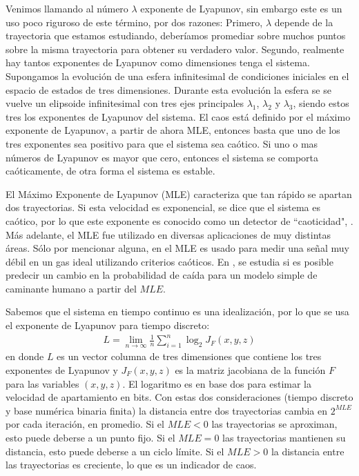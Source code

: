 Venimos llamando al número $\lambda$ exponente de Lyapunov, sin embargo este es un uso poco riguroso de este término, por dos razones:
Primero, $\lambda$ depende de la trayectoria que estamos estudiando, deberíamos promediar sobre muchos puntos sobre la misma trayectoria para obtener su verdadero valor.
Segundo, realmente hay tantos exponentes de Lyapunov como dimensiones tenga el sistema.
Supongamos la evolución de una esfera infinitesimal de condiciones iniciales en el espacio de estados de tres dimensiones.
Durante esta evolución la esfera se se vuelve un elipsoide infinitesimal con tres ejes principales $\lambda_1$, $\lambda_2$ y $\lambda_3$, siendo estos tres los exponentes de Lyapunov del sistema.
El caos está definido por el máximo exponente de Lyapunov, a partir de ahora MLE, entonces basta que uno de los tres exponentes sea positivo para que el sistema sea caótico.
Si uno o mas números de Lyapunov es mayor que cero, entonces el sistema se comporta caóticamente, de otra forma el sistema es estable.

El Máximo Exponente de Lyapunov (MLE) caracteriza que tan rápido se apartan dos trayectorias.
Si esta velocidad es exponencial, se dice que el sistema es caótico, por lo que este exponente es conocido como un detector de  ``caoticidad", \cite{strotgartz1994,Kantz1994,Sprott2003}.
Más adelante, el MLE fue utilizado en diversas aplicaciones de muy distintas áreas.
Sólo por mencionar alguna, en \cite{Ma2013} el MLE es usado para medir una señal muy débil en un gas ideal utilizando criterios caóticos.
En \cite{Bruijna2011}, se estudia si es posible predecir un cambio en la probabilidad de caída para un modelo simple de caminante humano a partir del $MLE$.

Sabemos que el sistema en tiempo continuo es una idealización, por lo que se usa el exponente de Lyapunov para tiempo discreto:
%
\begin{eqnarray}
\label{eq:LtdiscB2}
	L = \lim\limits_{n \to \infty} \frac{1}{n} \sum_{i=1}^{n} \log_2 J_F(x,y,z)
\end{eqnarray}
%
en donde $L$ es un vector columna de tres dimensiones que contiene los tres exponentes de Lyapunov y $J_F(x,y,z)$ es la matriz jacobiana de la función $F$ para las variables $(x,y,z)$.
El logaritmo es en base dos para estimar la velocidad de apartamiento en bits.
Con estas dos consideraciones (tiempo discreto y base numérica binaria finita) la distancia entre dos trayectorias cambia en $2^{MLE}$ por cada iteración, en promedio.
Si el $MLE<0$ las trayectorias se aproximan, esto puede deberse a un punto fijo.
Si el $MLE=0$ las trayectorias mantienen su distancia, esto puede deberse a un ciclo límite.
Si el $MLE>0$ la distancia entre las trayectorias es creciente, lo que es un indicador de caos.

